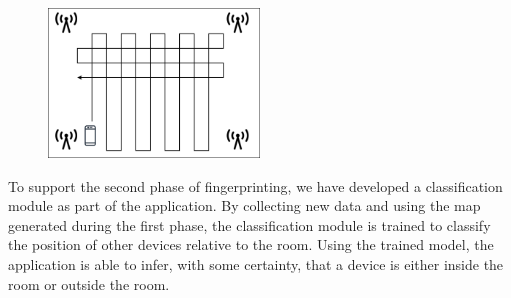 \begin{figure}[H]
    \centering
    \includegraphics[width=0.5\textwidth]{images/CreateMap.drawio.png}
    \caption{}
    \label{fig:CreateMap}
\end{figure}

To support the second phase of fingerprinting, we have developed a classification module as part of the application. 
By collecting new data and using the map generated during the first phase, the classification module is trained to classify the position of other devices relative to the room. 
Using the trained model, the application is able to infer, with some certainty, that a device is either inside the room or outside the room.

